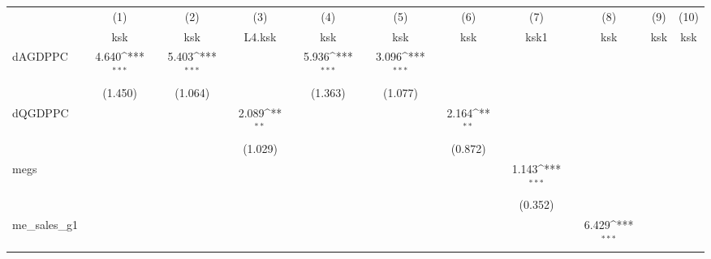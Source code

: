 {
\def\sym#1{\ifmmode^{#1}\else\(^{#1}\)\fi}
\begin{tabular}{l*{10}{c}}
\hline\hline
            &\multicolumn{1}{c}{(1)}&\multicolumn{1}{c}{(2)}&\multicolumn{1}{c}{(3)}&\multicolumn{1}{c}{(4)}&\multicolumn{1}{c}{(5)}&\multicolumn{1}{c}{(6)}&\multicolumn{1}{c}{(7)}&\multicolumn{1}{c}{(8)}&\multicolumn{1}{c}{(9)}&\multicolumn{1}{c}{(10)}\\
            &\multicolumn{1}{c}{ksk}&\multicolumn{1}{c}{ksk}&\multicolumn{1}{c}{L4.ksk}&\multicolumn{1}{c}{ksk}&\multicolumn{1}{c}{ksk}&\multicolumn{1}{c}{ksk}&\multicolumn{1}{c}{ksk1}&\multicolumn{1}{c}{ksk}&\multicolumn{1}{c}{ksk}&\multicolumn{1}{c}{ksk}\\
\hline
dAGDPPC     &       4.640\sym{***}&       5.403\sym{***}&                     &       5.936\sym{***}&       3.096\sym{***}&                     &                     &                     &                     &                     \\
            &     (1.450)         &     (1.064)         &                     &     (1.363)         &     (1.077)         &                     &                     &                     &                     &                     \\
[1em]
dQGDPPC     &                     &                     &       2.089\sym{**} &                     &                     &       2.164\sym{**} &                     &                     &                     &                     \\
            &                     &                     &     (1.029)         &                     &                     &     (0.872)         &                     &                     &                     &                     \\
[1em]
megs        &                     &                     &                     &                     &                     &                     &       1.143\sym{***}&                     &                     &                     \\
            &                     &                     &                     &                     &                     &                     &     (0.352)         &                     &                     &                     \\
[1em]
me\_sales\_g1 &                     &                     &                     &                     &                     &                     &                     &       6.429\sym{***}&                     &                     \\

\end{tabular}}
